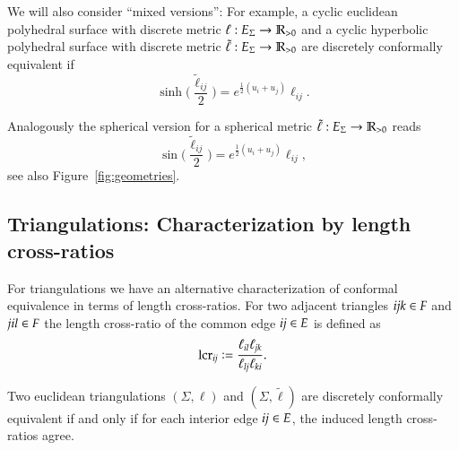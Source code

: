 \documentclass[Thesis]{subfiles}
\begin{document}
We will also consider ``mixed versions'': For example, a cyclic euclidean polyhedral surface with discrete metric $\ell:E_{\Sigma}\rightarrow\mathbb R_{>0}$ and a cyclic hyperbolic polyhedral surface with discrete metric $\tilde\ell:E_{\Sigma}\rightarrow\mathbb R_{>0}$ are discretely conformally equivalent if
\begin{equation*}
\sinh\Big(\frac{\tilde\ell_\mathit{ij}}{2}\Big)
= e^{\frac{1}{2}(u_{i}+u_{j})}\ell_\mathit{ij}.
\end{equation*}

Analogously the spherical version for a spherical metric $\tilde\ell:E_{\Sigma}\rightarrow\mathbb R_{>0}$ reads
\begin{equation*}
\sin\Big(\frac{\tilde\ell_\mathit{ij}}{2}\Big)
= e^{\frac{1}{2}(u_{i}+u_{j})}\ell_\mathit{ij},
\end{equation*}
see also Figure~\ref{fig:geometries}. 

\subsection{Triangulations: Characterization by length cross-ratios}
\label{sec:cross-ratios}

For triangulations we have an alternative characterization of conformal equivalence in terms of length cross-ratios. For two adjacent triangles $\it ijk\in F$ and $\it jil\in F$ the length cross-ratio of the common edge $\it ij\in E$ is defined as
\begin{equation}
\operatorname{lcr}_{\it ij}\vcentcolon=\frac{\ell_{\it il}\ell_{\it jk}}{\ell_{\it lj}\ell_{\it ki}}.
\end{equation}

\begin{proposition}
Two euclidean triangulations $(\Sigma, \ell)$ and $(\Sigma, \tilde \ell)$ are discretely conformally equivalent if and only if for each interior edge $\it ij\in E$, the induced length cross-ratios agree.
\end{proposition}
\end{document}
